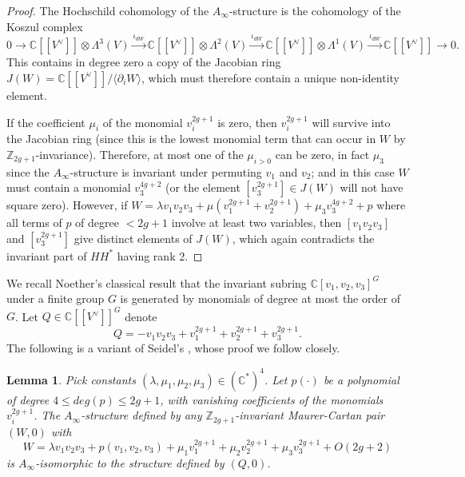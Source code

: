 \documentclass[reqno,10pt]{amsart}
\numberwithin{equation}{section}
\newcommand{\bC}{{\mathbb C}}
\newcommand{\bZ}{{\mathbb Z}}
\newtheorem{Lemma}[thm]{Lemma}
\theoremstyle{remark}
\begin{document}
\begin{proof}
 The Hochschild cohomology of the $A_{\infty}$-structure is the cohomology of the Koszul complex
 \begin{equation} \label{Eqn:Koszul}
0 \rightarrow \bC[[V^{\vee}]] \otimes \Lambda^3(V) \xrightarrow{\iota_{dW}}  \bC[[V^{\vee}]] \otimes \Lambda^2(V) \xrightarrow{\iota_{dW}} \bC[[V^{\vee}]]\otimes \Lambda^1(V) \xrightarrow{\iota_{dW}} \bC[[V^{\vee}]] \rightarrow 0.
\end{equation}
 This contains in degree zero a copy of the Jacobian ring $J(W) = \bC[[V^{\vee}]] / \langle \partial_iW \rangle $, which must therefore contain a unique non-identity element.  
 
 If the coefficient $\mu_i$ of the monomial $v_i^{2g+1}$ is zero, then $v_i^{2g+1}$ will survive into the Jacobian ring (since this is the lowest monomial term that can occur in $W$ by $\bZ_{2g+1}$-invariance). Therefore, at most one of the $\mu_{i>0}$ can be zero, in fact $\mu_3$ since the $A_{\infty}$-structure is invariant under permuting $v_1$ and $v_2$; and in this case $W$ must contain a monomial $v_3^{4g+2}$ (or the element $[v_3^{2g+1}] \in J(W)$ will not have square zero). However, if $W = \lambda v_1v_2v_3 + \mu(v_1^{2g+1} + v_2^{2g+1}) + \mu_3v_3^{4g+2} + p$ where all terms of $p$ of degree $< 2g+1$ involve at least two variables, then $[v_1v_2v_3]$ and $[v_3^{2g+1}]$ give distinct elements of $J(W)$, which again contradicts the invariant part of $HH^*$ having rank 2.
 \end{proof}

We recall Noether's classical result \cite{Noether} that the invariant subring $\bC[v_1, v_2, v_3]^G$ under a finite group $G$ is generated by monomials of degree at most the order of $G$.  Let $Q \in \bC[[V^{\vee}]]^G$ denote 
\[
Q = -v_1v_2v_3 + v_1^{2g+1} + v_2^{2g+1} + v_3^{2g+1}.
\]
The following is a variant of Seidel's \cite[Lemma 4.1]{Seidel:HMSgenus2}, whose proof we follow closely.  

\begin{Lemma} \label{Lem:FinitelyDetermined}
Pick constants $(\lambda,\mu_1,\mu_2,\mu_3) \in (\bC^*)^4$. Let $p(\cdot)$ be a polynomial of degree $4 \leq deg(p) \leq 2g+1$, with vanishing coefficients of the monomials $v_i^{2g+1}$.
The $A_{\infty}$-structure defined by any $\bZ_{2g+1}$-invariant Maurer-Cartan pair $(W,0)$ with
\[
W = \lambda v_1v_2v_3  + p(v_1, v_2, v_3) +  \mu_1 v_1^{2g+1} + \mu_2v_2^{2g+1} + \mu_3v_3^{2g+1} + O(2g+2) \] 
is $A_{\infty}$-isomorphic to the structure defined by $(Q,0)$.
\end{Lemma}
\end{document}
